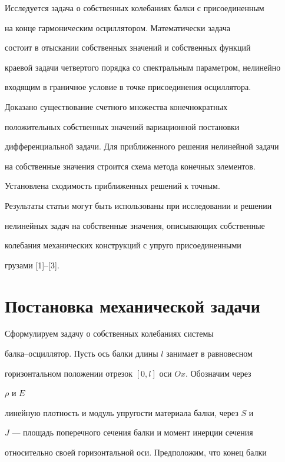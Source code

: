  


Исследуется задача о собственных колебаниях балки с присоединенным  


на конце гармоническим осциллятором. Математически задача  


состоит в отыскании собственных значений и собственных функций  


краевой задачи четвертого порядка со спектральным параметром, нелинейно  


входящим в граничное условие в точке присоединения осциллятора.  


Доказано существование счетного множества конечнократных  


положительных собственных значений вариационной постановки  


дифференциальной задачи. Для приближенного решения нелинейной задачи  


на собственные значения строится схема метода конечных элементов.  


Установлена сходимость приближенных решений к точным. 


Результаты статьи могут быть использованы при исследовании и решении  


нелинейных задач на собственные значения, описывающих собственные  


колебания механических конструкций с упруго присоединенными  


грузами [1]--[3]. 


 


\section{Постановка механической задачи} 


 


Сформулируем задачу о собственных колебаниях системы  


балка--осциллятор. Пусть ось балки длины $l$ занимает в равновесном  


горизонтальном положении отрезок $[0,l]$ оси $Ox$. Обозначим через 


$\rho$ и $E$ 


линейную плотность и модуль упругости материала балки, через $S$ и  


$J$ --- площадь поперечного сечения балки и момент инерции сечения  


относительно своей горизонтальной оси. Предположим, что конец балки  



